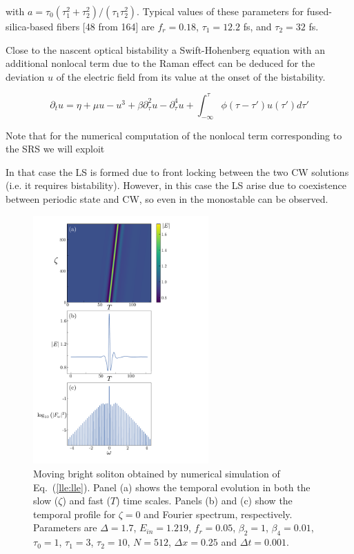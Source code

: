 with $a = \tau_0 (\tau_1 ^2 + \tau_2 ^2)/(\tau_1 \tau_2 ^2)$. Typical values of these parameters for fused-silica-based fibers
[48 from 164] are $f_r = 0.18$, $\tau_1 = 12.2$ fs, and $\tau_2 = 32$ fs.

Close to the nascent optical bistability a Swift-Hohenberg equation with an additional nonlocal term due to the Raman effect
can be deduced for the deviation $u$ of the electric field from its value at the onset of the bistability.

\begin{equation}
    \partial_t u = \eta + \mu u - u^3 + \beta \partial_\tau^2 u - \partial_\tau^4 u + \int_{-\infty}^\tau \phi(\tau - \tau')u(\tau')d\tau'
    \label{lle:shraman}
\end{equation}

Note that for the numerical computation of the nonlocal term corresponding to the SRS we will exploit 

In that case the LS is formed due to front locking between the two CW solutions (i.e. it requires bistability). 
However, in this case the LS arise due to coexistence between periodic state and CW, so even in the monostable can be observed.


\begin{figure}
    \centering
    \caption{Moving bright soliton obtained by numerical simulation of Eq.~(\ref{lle:lle}). Panel
    (a) shows the temporal evolution in both the slow ($\zeta$) and fast ($T$) time scales. Panels
    (b) and (c) show the temporal profile for $\zeta=0$ and Fourier spectrum, respectively. Parameters are
    $\Delta=1.7$, $E_{in}=1.219$, $f_r = 0.05$, $\beta_2 = 1$, $\beta_4 = 0.01$, $\tau_0=1$, $\tau_1=3$,
    $\tau_2=10$, $N=512$, $\Delta x=0.25$ and $\Delta t=0.001$.}
    \includegraphics[width=0.6\textwidth]{imagenes/lle/LLE_Spatiotemporal.pdf}
\end{figure}

